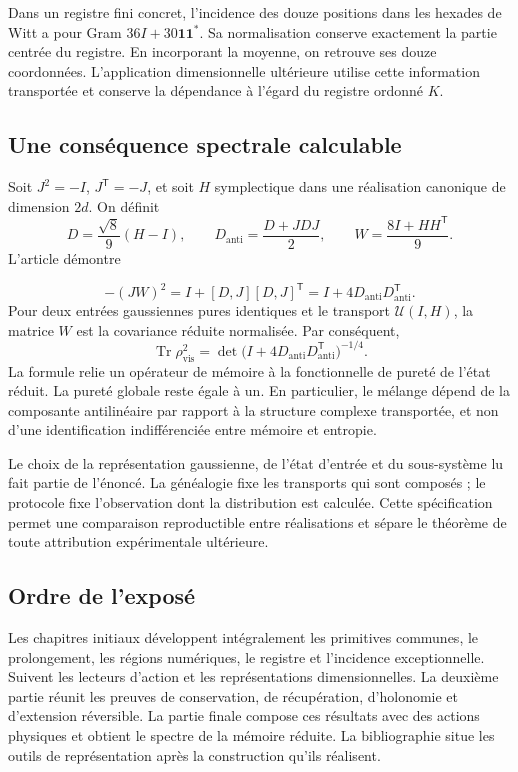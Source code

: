 Dans un registre fini concret, l’incidence des douze positions dans les hexades de Witt a pour Gram
\(36I+30\mathbf1\mathbf1^*\). Sa normalisation conserve exactement la partie centrée du registre. En incorporant la moyenne, on retrouve ses douze coordonnées. L’application dimensionnelle ultérieure utilise cette information transportée et conserve la dépendance à l’égard du registre ordonné \(K\).

\subsection{Une conséquence spectrale calculable}
Soit \(J^2=-I\), \(J^{\mathsf T}=-J\), et soit \(H\) symplectique dans une réalisation canonique de dimension \(2d\). On définit
\[
D=\frac{\sqrt8}{9}(H-I),\qquad
D_{\mathrm{anti}}=\frac{D+JDJ}{2},\qquad
W=\frac{8I+HH^{\mathsf T}}9.
\]
L’article démontre

\begin{equation}
\boxed{-(JW)^2=I+[D,J][D,J]^{\mathsf T}
=I+4D_{\mathrm{anti}}D_{\mathrm{anti}}^{\mathsf T}.}
\label{nuclear:eq:espectro}
\end{equation}
Pour deux entrées gaussiennes pures identiques et le transport \(\mathcal U(I,H)\), la matrice \(W\) est la covariance réduite normalisée. Par conséquent,
\[
\operatorname{Tr}\rho_{\mathrm{vis}}^2
=\det\bigl(I+4D_{\mathrm{anti}}D_{\mathrm{anti}}^{\mathsf T}\bigr)^{-1/4}.
\]
La formule relie un opérateur de mémoire à la fonctionnelle de pureté de l’état réduit. La pureté globale reste égale à un. En particulier, le mélange dépend de la composante antilinéaire par rapport à la structure complexe transportée, et non d’une identification indifférenciée entre mémoire et entropie.


Le choix de la représentation gaussienne, de l’état d’entrée et du sous-système lu fait partie de l’énoncé. La généalogie fixe les transports qui sont composés ; le protocole fixe l’observation dont la distribution est calculée. Cette spécification permet une comparaison reproductible entre réalisations et sépare le théorème de toute attribution expérimentale ultérieure.

\subsection{Ordre de l’exposé}
Les chapitres initiaux développent intégralement les primitives communes, le prolongement, les régions numériques, le registre et l’incidence exceptionnelle. Suivent les lecteurs d’action et les représentations dimensionnelles. La deuxième partie réunit les preuves de conservation, de récupération, d’holonomie et d’extension réversible. La partie finale compose ces résultats avec des actions physiques et obtient le spectre de la mémoire réduite. La bibliographie situe les outils de représentation après la construction qu’ils réalisent.

